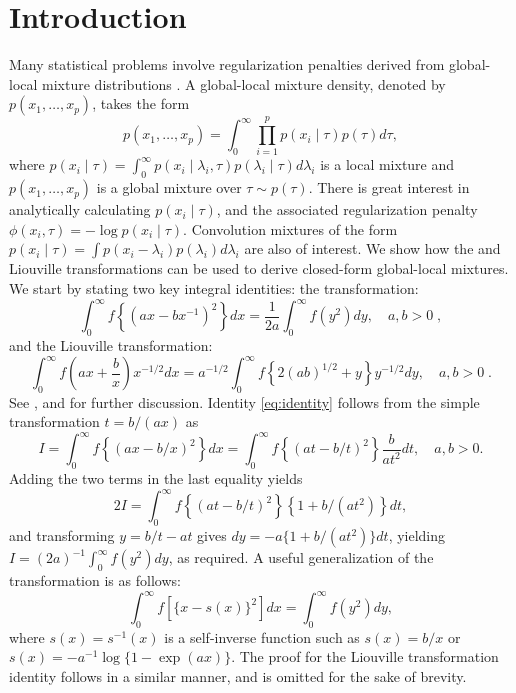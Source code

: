 \documentclass[11pt]{article}
\begin{document}
\section{Introduction}
Many statistical problems involve regularization penalties derived from global-local mixture distributions \citep{polson_data_2011, hans2011comment, bhadra2015horseshoe+}. A global-local mixture density, denoted by $p(x_1, \ldots, x_p)$, takes the form 
\[
p(x_1, \ldots, x_p) = \int_{0}^{\infty}\prod_{i=1}^{p} p(x_i \mid \tau) p(\tau) d\tau, 
\]
where $p(x_i \mid \tau) = \int_{0}^{\infty} p(x_i \mid \lambda_i, \tau) p(\lambda_i \mid \tau) d\lambda_i$ is a local mixture and $p(x_1, \ldots, x_p)$ is a global mixture over $\tau \sim p(\tau)$. There is great interest in analytically calculating $p(x_i \mid \tau)$, and the associated regularization penalty $\phi(x_i, \tau) = -\log p(x_i \mid \tau)$. Convolution mixtures of the form $p(x_i \mid \tau) = \int p(x_i - \lambda_i) p(\lambda_i) d \lambda_i$ are also of interest. We show how the \CS{} and Liouville transformations can be used to derive closed-form global-local mixtures.  We start by stating two key integral identities: the \CS{} transformation:
\begin{equation}
  \int_0^\infty f \left\{ ( a x - b x^{-1} )^2 \right\} d x = \frac{1}{2a} \int_0^\infty f(y^2) d y, \quad a, b >0  \;, \label{eq:identity}
\end{equation}
and the Liouville transformation:
\begin{equation}
  \int_{0}^{\infty} f\left(ax + \frac{b}{x} \right) x^{-1/2}dx = a^{-1/2} \int_{0}^{\infty} f\left\{ 2 (ab)^{1/2} + y \right\} y^{-1/2} dy, \quad a, b >0  \;. 
  \label{eq:liouville}
\end{equation}
See \citet{boros2006irresistible}, \citet{baker2008probabilistic} and \citet{jones_generating_2014} for further discussion. Identity \eqref{eq:identity} follows from the simple transformation $t = b/(a x)$ as
\begin{equation*}
  I = \int_{0}^{\infty} f \left\{(ax - b/x)^2 \right\} dx = \int_{0}^{\infty} f \left\{(at - b/t)^2 \right\} \frac{b}{a t^2} dt, \quad a, b >0.
\end{equation*}
Adding the two terms in the last equality yields 
\[
2 I = \int_{0}^{\infty} f \left\{(at - b/t)^2 \right\} \left\{ 1+{b}/({a t^2}) \right\} dt,
\]
\sloppy
and transforming $y = b/t - at$ gives $dy = -a \{1+{b}/({a t^2})\} dt$, yielding $I = (2a)^{-1} \int_{0}^{\infty} f(y^2) dy$, as required. A useful generalization of the \CS{} transformation is as follows: 
\begin{equation}
  \int_0^\infty f\left[ \{x-s(x)\}^2 \right] dx =  \int_0^\infty f( y^2 ) dy, \label{eq:gen}
\end{equation}
where $s(x)=s^{-1}(x)$ is a self-inverse function such as $s(x) = b/x$ or $s(x) = -a^{-1}\log\{1-\exp(a x)\}$. The proof for the Liouville transformation identity follows in a similar manner, and is omitted for the sake of brevity. %
\end{document}
